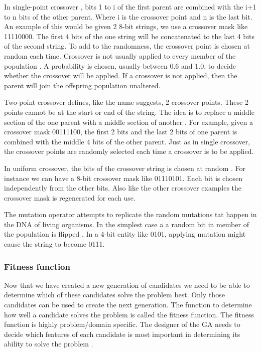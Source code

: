 \documentclass[12pt,a4paper]{report}
\begin{document}
In single-point crossover \citep{michell}, bits 1 to i of the first parent are combined with the i+1 to n bits of the other parent. Where i is the crossover point and n is the last bit. An example of this would be given 2 8-bit strings, we use a crossover mask like 11110000. The first 4 bits of the one string will be concatenated to the last 4 bits of the second string. To add to the randomness, the crossover point is chosen at random each time. Crossover is not usually applied to every member of the population \citep{beasley}. A probability is chosen, usually between 0.6 and 1.0, to decide whether the crossover will be applied. If a crossover is not applied, then the parent will join the offspring population unaltered.

Two-point crossover defines, like the name suggests, 2 crossover points. These 2 points cannot be at the start or end of the string. The idea is to replace a middle section of the one parent with a middle section of another \citep{michell}. For example, given a crossover mask 00111100, the first 2 bits and the last 2 bits of one parent is combined with the middle 4 bits of the other parent. Just as in single crossover, the crossover points are randomly selected each time a crossover is to be applied.

In uniform crossover, the bits of the crossover string is chosen at random \citep{michell}. For instance we can have a 8-bit crossover mask like 01110101. Each bit is chosen independently from the other bits. Also like the other crossover examples the crossover mask is regenerated for each use.

The mutation operator attempts to replicate the random mutations tat happen in the DNA of living organisms. In the simplest case a a random bit in member of the population is flipped \citep{michell}. In a 4-bit entity like 0101, applying mutation might cause the string to become 0111.   

\subsubsection{Fitness function}
Now that we have created a new generation of candidates we need to be able to determine which of these candidates solve the problem best. Only those candidates can be used to create the next generation. The function to determine how well a candidate solves the problem is called the fitness function. The fitness function is highly problem/domain specific. The designer of the GA needs to decide which features of each candidate is most important in determining its ability to solve the problem \citep{beasley}.
\end{document}
